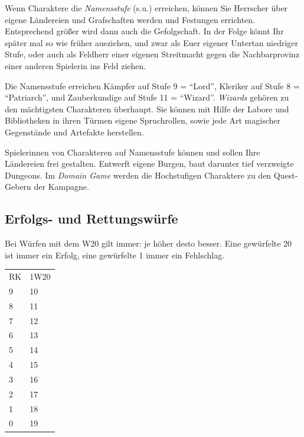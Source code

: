 \documentclass[11pt]{wbzine}
\begin{document}
\begin{multicols}{2}
    Wenn Charaktere die \textit{Namensstufe} (s.u.) erreichen,
    können Sie Herrscher über eigene Ländereien und Grafschaften
    werden und Festungen errichten. Entsprechend größer wird dann
    auch die Gefolgschaft. In der Folge könnt Ihr später mal so wie
    früher ausziehen, und zwar als Euer eigener Untertan niedriger
    Stufe, oder auch als Feldherr einer eigenen Streitmacht gegen
    die Nachbarprovinz einer anderen Spielerin ins Feld ziehen.
    
    Die Namensstufe erreichen Kämpfer auf Stufe 9 = ``Lord'',
    Kleriker auf Stufe 8 = ``Patriarch'', und Zauberkundige auf
    Stufe 11 = ``Wizard''. \textit{Wizards} gehören zu den
    mächtigsten Charakteren überhaupt. Sie können mit Hilfe der
    Labore und Bibliotheken in ihren Türmen eigene Spruchrollen,
    sowie jede Art magischer Gegenstände und Artefakte herstellen.
    


    Spielerinnen von Charakteren auf Namensstufe können und
    sollen Ihre Ländereien frei gestalten. Entwerft eigene Burgen,
    baut darunter tief verzweigte Dungeons. Im \textit{Domain Game}
    werden die Hochstufigen Charaktere zu den Quest-Gebern der
    Kampagne.

    \subsection{Erfolgs- und Rettungswürfe}

    Bei Würfen mit dem W20 gilt immer: je höher desto besser. Eine
    gewürfelte 20 ist immer ein Erfolg, eine gewürfelte 1 immer ein
    Fehlschlag.

    \begin{tabularx}{\columnwidth}{YY}
       RK  & 1W20 \\
       9  &    10 \\
       8  &    11 \\
       7  &    12 \\
       6  &    13 \\
       5  &    14 \\
       4  &    15 \\
       3  &    16 \\
       2  &    17 \\
       1  &    18 \\
       0  &    19 \\
    \end{tabularx}
   

\end{multicols}
\end{document}
